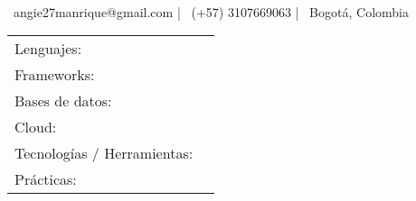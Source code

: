\documentclass[]{awesome-cv}
\begin{document}
    
\begin{center}
	  \\
	\vspace{2mm}
	{\hspace{0.8cm}\faEnvelope\ angie27manrique@gmail.com}  |  {\faMobile\ (+57) 3107669063}  |  {\faMapMarker\ Bogotá, Colombia} 
\end{center}
\vspace{-2mm}

\begin{cventries}
	\vspace{-2mm}
	\cventry
	{}
	{\def\arraystretch{1.15}{\begin{tabular}{ l l }
		Lenguajes:  & {\skill{ Java, C\#, TypeScript, SQL, Python.}} \\
		Frameworks:  & {\skill{ Spring, Angular.}} \\
		Bases de datos:  & {\skill{ PostgreSQL, MySQL, SQLServer, MongoDB.}} \\
		Cloud:  & {\skill{ AWS, Azure.}} \\
		Tecnologías / Herramientas: \hspace{0.05cm} & {\skill{ Docker, Jenkins, GraphQL, Kafka, SonarQube, Maven, npm, Git.}} \\
		Prácticas:  & {\skill{ Agile, Scrum, SOLID Principles, Test-Driven Development, Code Reviews.}} \\
		\end{tabular}}}
	{}
	{}
	{}
\end{cventries}
\vspace{-12mm}
\end{document}
